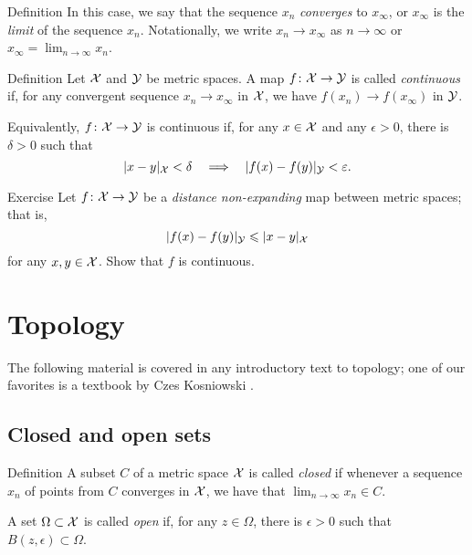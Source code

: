 \begin{multicols}{2}
{\begin{thm}{Definition}
In this case, we say that the sequence $x_n$ {}\emph{converges} to $x_\infty$, 
or $x_\infty$ is the {}\emph{limit} of the sequence $x_n$.
Notationally, we write $x_n\to x_\infty$ as $n\to\infty$
or $x_\infty=\lim_{n\to\infty} x_n$.
\end{thm}

\begin{thm}{Definition}\label{def:continuous}
Let $\mathcal{X}$ and $\mathcal{Y}$ be metric spaces.
A map $f\colon\mathcal{X}\to \mathcal{Y}$ is called \emph{continuous} if, for any convergent sequence $x_n\to x_\infty$ in ${\mathcal{X}}$,
we have $f(x_n) \to f(x_\infty)$ in $\mathcal{Y}$.

Equivalently, $f\colon\mathcal{X}\to \mathcal{Y}$ is continuous if, for any $x\in {\mathcal{X}}$ and any $\epsilon>0$,
there is $\delta>0$ such that 
$$\dist{x}{y}{\spc{X}}<\delta\quad \Longrightarrow\quad \dist{f(x)}{f(y)}{\spc{Y}}<\epsilon.$$

\end{thm}

\begin{thm}{Exercise}\label{ex:shrt=>continuous}
Let $f\colon\mathcal{X}\to \mathcal{Y}$ be a {}\emph{distance non-expanding} map between metric spaces; that is, 
\[\dist{f(x)}{f(y)}{\spc{Y}}\le \dist{x}{y}{\spc{X}}\]
for any $x,y\in \mathcal{X}$.
Show that $f$ is continuous.
\end{thm}

\section{Topology}\label{sec:topology}

The following material is covered in any introductory text to topology; 
one of our favorites is a textbook by Czes Kosniowski \cite{kosniowski}.

\subsection*{Closed and open sets}

\begin{thm}{Definition}
A subset $C$ of a metric space $\mathcal{X}$ is called \emph{closed} if whenever a sequence $x_n$ of points from $C$ converges in $\mathcal{X}$, we have that $\lim_{n\to\infty} x_n \in C$.

A set $\Omega \subset \mathcal{X}$ is called \emph{open} if, for any $z\in \Omega$, 
there is $\epsilon>0$ such that $B(z,\epsilon)\subset\Omega$.
\end{thm}

}
\end{multicols}
